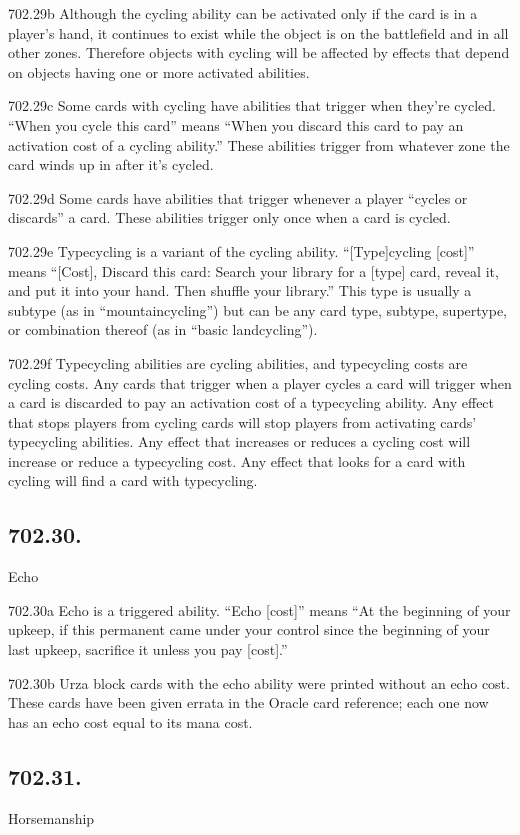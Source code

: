 702.29b Although the cycling ability can be activated only if the card is in a player’s hand, it continues to exist while the object is on the battlefield and in all other zones. Therefore objects with cycling will be affected by effects that depend on objects having one or more activated abilities.

702.29c Some cards with cycling have abilities that trigger when they’re cycled. “When you cycle this card” means “When you discard this card to pay an activation cost of a cycling ability.” These abilities trigger from whatever zone the card winds up in after it’s cycled.

702.29d Some cards have abilities that trigger whenever a player “cycles or discards” a card. These abilities trigger only once when a card is cycled.

702.29e Typecycling is a variant of the cycling ability. “[Type]cycling [cost]” means “[Cost], Discard this card: Search your library for a [type] card, reveal it, and put it into your hand. Then shuffle your library.” This type is usually a subtype (as in “mountaincycling”) but can be any card type, subtype, supertype, or combination thereof (as in “basic landcycling”).

702.29f Typecycling abilities are cycling abilities, and typecycling costs are cycling costs. Any cards that trigger when a player cycles a card will trigger when a card is discarded to pay an activation cost of a typecycling ability. Any effect that stops players from cycling cards will stop players from activating cards’ typecycling abilities. Any effect that increases or reduces a cycling cost will increase or reduce a typecycling cost. Any effect that looks for a card with cycling will find a card with typecycling.

\subsection*{702.30.}
Echo

702.30a Echo is a triggered ability. “Echo [cost]” means “At the beginning of your upkeep, if this permanent came under your control since the beginning of your last upkeep, sacrifice it unless you pay [cost].”

702.30b Urza block cards with the echo ability were printed without an echo cost. These cards have been given errata in the Oracle card reference; each one now has an echo cost equal to its mana cost.

\subsection*{702.31.}
Horsemanship

